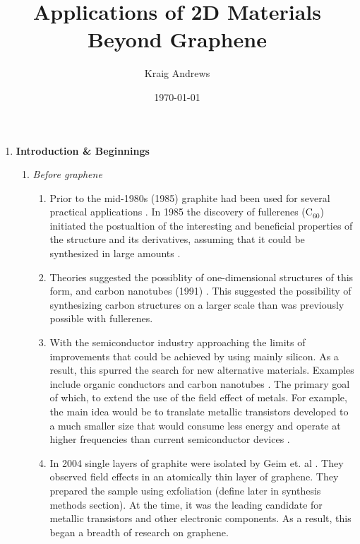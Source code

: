 \documentclass{article}
\author{Kraig Andrews}
\title{Applications of 2D Materials Beyond Graphene}
\date{\today}
\begin{document}
\maketitle

\begin{enumerate}%
	\item{ \textbf{Introduction \& Beginnings}}
	\begin{enumerate} %
		\item{\textit{Before graphene}}
			\begin{enumerate} %

				\item{Prior to the mid-1980s (1985) graphite had been used for several practical applications \cite{ nanoscaleReview2011}. In 1985 the discovery of fullerenes ($\mathrm{C}_{60}$) initiated the postualtion of the interesting and beneficial properties of the structure and its derivatives, assuming that it could be synthesized in large amounts \cite{krotoFullerenes1985}. }

				\item{Theories suggested the possiblity of one-dimensional structures of this form, and carbon nanotubes (1991) \cite{iijimaCarbonNanotubes1991}. This suggested the possibility of synthesizing carbon structures on a larger scale than was previously possible with fullerenes.}

				\item{With the semiconductor industry approaching the limits of improvements that could be achieved by using mainly silicon. As a result, this spurred the search for new alternative materials. Examples include organic conductors \cite{novoselovEtAl2004, mascaro2001} and carbon nanotubes \cite{Baughman2002}. The primary goal of which, to extend the use of the field effect of metals. For example, the main idea would be to translate metallic transistors developed to a much smaller size that would consume less energy and operate at higher frequencies than current semiconductor devices \cite{novoselovEtAl2004,Rotkin2004}.}

				\item{In 2004 single layers of graphite were isolated by Geim et. al \cite{novoselovEtAl2004, novoselovEtAl2005}. They observed field effects in an atomically thin layer of graphene. They prepared the sample using exfoliation (define later in synthesis methods section). At the time, it was the leading candidate for metallic transistors and other electronic components. As a result, this began a breadth of research on graphene.}


\end{enumerate}
\end{enumerate}
\end{enumerate}
\end{document}
